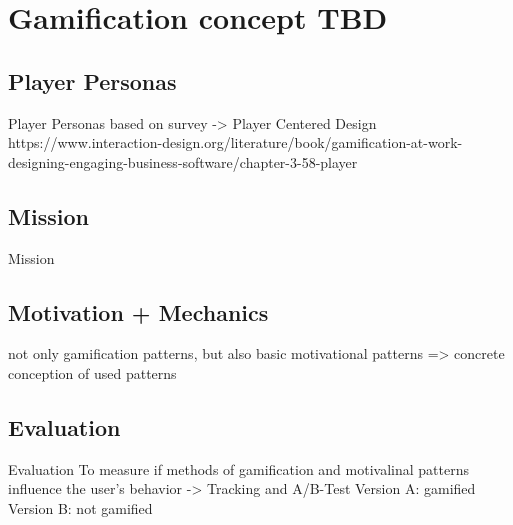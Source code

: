 
\section{Gamification concept TBD}
\label{sec:domainC}

\subsection{Player Personas}
\label{sec:domainCa}
Player Personas based on survey -> Player Centered Design
https://www.interaction-design.org/literature/book/gamification-at-work-designing-engaging-business-software/chapter-3-58-player

\subsection{Mission}
\label{sec:domainCb}
Mission

\subsection{Motivation + Mechanics}
\label{sec:domainCc}
not only gamification patterns, but also basic motivational patterns => concrete conception of used patterns

\subsection{Evaluation}
\label{sec:domainCd}
Evaluation
To measure if methods of gamification and motivalinal patterns influence the user's behavior -> Tracking and A/B-Test
Version A: gamified
Version B: not gamified